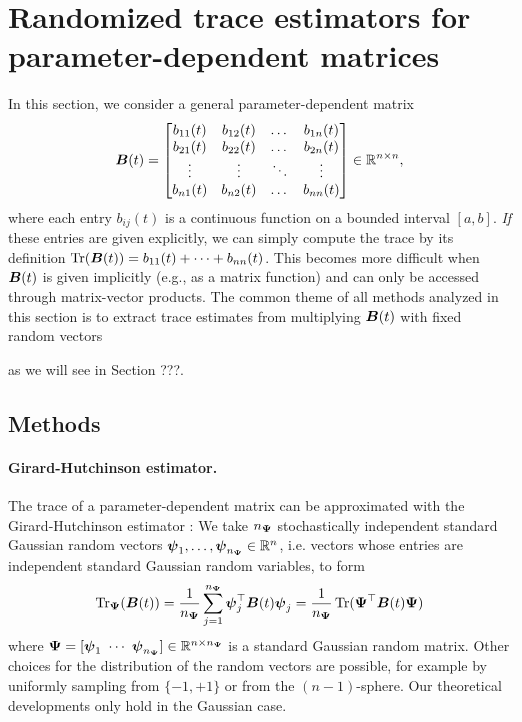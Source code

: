 
\section{Randomized trace estimators for parameter-dependent matrices}
\label{sec:analysis}

\color{blue}
In this section, we consider a general parameter-dependent matrix
\begin{equation*}
    \boldsymbol{B}(t) = \begin{bmatrix}
        b_{11}(t) & b_{12}(t) & \dots & b_{1n}(t) \\
        b_{21}(t) & b_{22}(t) & \dots & b_{2n}(t) \\
        \vdots & \vdots & \ddots & \vdots \\
        b_{n1}(t) & b_{n2}(t) & \dots & b_{nn}(t) \\
    \end{bmatrix} \in \mathbb{R}^{n \times n},
\end{equation*}
where each entry $b_{ij}(t)$ is a continuous function on a bounded interval $[a,b]$. \emph{If} these entries are given explicitly, we can simply compute the trace by its definition 
$\operatorname{Tr}(\boldsymbol{B}(t)) = b_{11}(t)+ \cdots + b_{nn}(t)$. This becomes more difficult when $\boldsymbol{B}(t)$ is given implicitly (e.g., as a matrix function) and can only be accessed through matrix-vector products. The common theme of all methods analyzed in this section is to extract trace estimates from multiplying $\boldsymbol{B}(t)$ with fixed random vectors

as we will see in Section ???.
\color{black}

\subsection{Methods}
\label{subsec:methods}

\paragraph{Girard-Hutchinson estimator.} The trace of a parameter-dependent matrix can be approximated with the Girard-Hutchinson estimator \cite{girard-1989-fast-montecarlo,hutchinson-1990-stochastic-estimator}: We take $n_{\boldsymbol{\Psi}}$ stochastically independent standard Gaussian random vectors $\boldsymbol{\psi}_1,\dots, \boldsymbol{\psi}_{n_{\boldsymbol{\Psi}}} \in \mathbb{R}^{n}$, i.e. vectors whose entries are independent standard Gaussian random variables, to form
\begin{equation}
    \operatorname{Tr}_{\boldsymbol{\Psi}}(\boldsymbol{B}(t))
    = \frac{1}{n_{\boldsymbol{\Psi}}} \sum_{j=1}^{n_{\boldsymbol{\Psi}}} \boldsymbol{\psi}_j^{\top} \boldsymbol{B}(t) \boldsymbol{\psi}_j
    = \frac{1}{n_{\boldsymbol{\Psi}}} \operatorname{Tr}( \boldsymbol{\Psi}^{\top} \boldsymbol{B}(t) \boldsymbol{\Psi})
    \label{equ:hutchinson-trace-estimator}
\end{equation}
where $\boldsymbol{\Psi} = [\boldsymbol{\psi}_1 ~ \cdots ~ \boldsymbol{\psi}_{n_{\boldsymbol{\Psi}}}] \in \mathbb{R}^{n \times n_{\boldsymbol{\Psi}}}$ is a standard Gaussian random matrix. Other choices for the distribution of the random vectors are possible, for example by uniformly sampling from $\{-1, +1\}$ or from the $(n-1)$-sphere. Our theoretical developments only hold in the Gaussian case.

